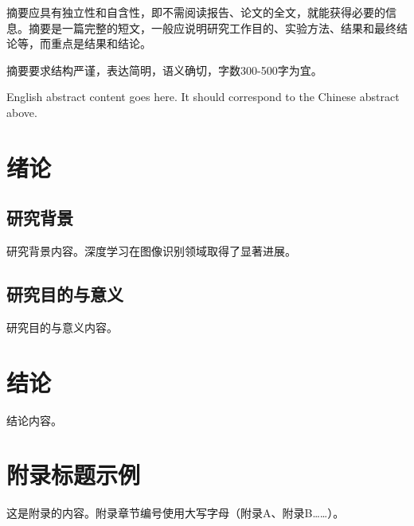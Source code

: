 \documentclass[
    degree=bachelor,
    StudentName=张三,
    StudentID=2020123456,
    AdvisorName=李四,
    Major=计算机科学与技术,
    Department=计算机学院,
    SubmitYear=2024,
    SubmitMonth=6,
    Title=基于某某方法的某课题研究,
    TitleEng={Research on Some Topic Based on Some Method},  %
]{cauc_thesis}
\begin{document}
\frontmatter

\makecover

\begin{abstract-zh}
    摘要应具有独立性和自含性，即不需阅读报告、论文的全文，就能获得必要的信息。摘要是一篇完整的短文，一般应说明研究工作目的、实验方法、结果和最终结论等，而重点是结果和结论。

    摘要要求结构严谨，表达简明，语义确切，字数300-500字为宜。

\end{abstract-zh}

\begin{abstract-en}
    English abstract content goes here. It should correspond to the Chinese abstract above.

\end{abstract-en}

\makefrontmatter

\mainmatter

\chapter{绪论}

\section{研究背景}

研究背景内容。深度学习在图像识别领域取得了显著进展\cite{he2016deep}。

\section{研究目的与意义}

研究目的与意义内容。

\chapter{结论}

结论内容。

\appendix
\chapter{附录标题示例}

这是附录的内容。附录章节编号使用大写字母（附录A、附录B……）。

\end{document}
